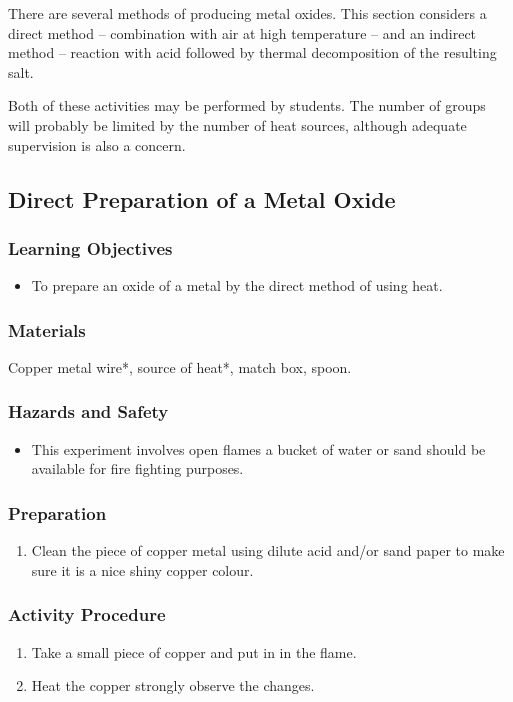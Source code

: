 There are several methods of producing metal oxides. This section considers a direct method -- combination with air at high temperature -- and an indirect method -- reaction with acid followed by thermal decomposition of the resulting salt.

Both of these activities may be performed by students. The number of groups will probably be limited by the number of heat sources, although adequate supervision is also a concern.

\subsection{Direct Preparation of a Metal Oxide}

\subsubsection*{Learning Objectives}
\begin{itemize}
\item{To prepare an oxide of a metal by the direct method of using heat.}
\end{itemize}

\subsubsection*{Materials}
Copper metal wire*, source of heat*, match box, spoon.

\subsubsection*{Hazards and Safety}
\begin{itemize}
\item{This experiment involves open flames a bucket of water or sand should be available for fire fighting purposes.}
\end{itemize}
\subsubsection*{Preparation}
\begin{enumerate}
\item Clean the piece of copper metal using dilute acid and/or sand paper to make sure it is a nice shiny copper colour.
\end{enumerate}
\subsubsection*{Activity Procedure}
\begin{enumerate}
\item{Take a small piece of copper and put in in the flame.}
\item{Heat the copper strongly observe the changes.}
\end{enumerate}

